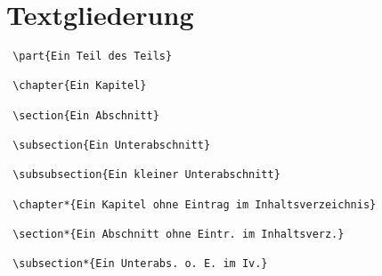 \KOMAScript{}









\section{Textgliederung}

\begin{lstlisting}
 \part{Ein Teil des Teils}
 
 \chapter{Ein Kapitel}
 
 \section{Ein Abschnitt}
 
 \subsection{Ein Unterabschnitt}
 
 \subsubsection{Ein kleiner Unterabschnitt}
 
 \chapter*{Ein Kapitel ohne Eintrag im Inhaltsverzeichnis}
 
 \section*{Ein Abschnitt ohne Eintr. im Inhaltsverz.}
 
 \subsection*{Ein Unterabs. o. E. im Iv.}
 

\end{lstlisting}
